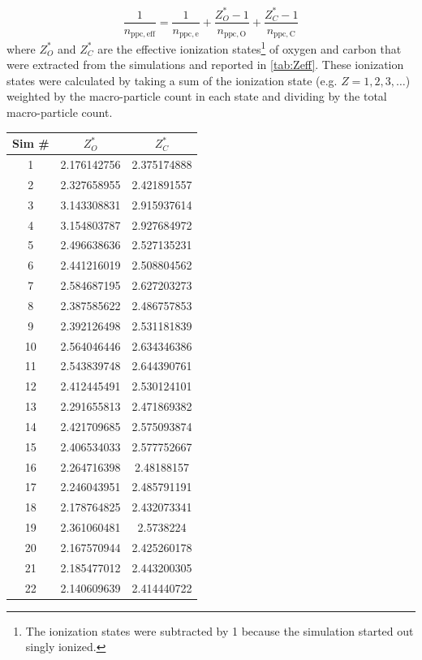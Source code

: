 \begin{equation}
	\frac{1}{n_\mathrm{ppc,eff}} = \frac{1}{n_\mathrm{ppc,e}} + \frac{Z^*_O-1}{n_\mathrm{ ppc,O}} +\frac{Z^*_C-1}{n_\mathrm{ppc,C}}
	\label{eq:neff}
\end{equation}
where $Z_O^*$ and $Z_C^*$ are the effective ionization states\footnote{The ionization states were subtracted by 1 because the simulation started out singly ionized.} of oxygen and carbon that were extracted from the simulations and reported in \autoref{tab:Zeff}. These ionization states were calculated by taking a sum of the ionization state (e.g. $Z = {1, 2, 3, \ldots}$) weighted by the macro-particle count in each state and dividing by the total macro-particle count.

\begin{table}
	\centering
	\begin{tabular}{c|c|c}
		\hline
		Sim \# & $Z_O^*$ & $Z_C^*$ \\ \hline
		1 & 2.176142756 & 2.375174888 \\ 
		2 & 2.327658955 & 2.421891557 \\ 
		3 & 3.143308831 & 2.915937614 \\ 
		4 & 3.154803787 & 2.927684972 \\ 
		5 & 2.496638636 & 2.527135231 \\ 
		6 & 2.441216019 & 2.508804562 \\ 
		7 & 2.584687195 & 2.627203273 \\ 
		8 & 2.387585622 & 2.486757853 \\ 
		9 & 2.392126498 & 2.531181839 \\ 
		10 & 2.564046446 & 2.634346386 \\ 
		11 & 2.543839748 & 2.644390761 \\ 
		12 & 2.412445491 & 2.530124101 \\ 
		13 & 2.291655813 & 2.471869382 \\ 
		14 & 2.421709685 & 2.575093874 \\ 
		15 & 2.406534033 & 2.577752667 \\ 
		16 & 2.264716398 & 2.48188157 \\ 
		17 & 2.246043951 & 2.485791191 \\ 
		18 & 2.178764825 & 2.432073341 \\ 
		19 & 2.361060481 & 2.5738224 \\ 
		20 & 2.167570944 & 2.425260178 \\ 
		21 & 2.185477012 & 2.443200305 \\ 
		22 & 2.140609639 & 2.414440722 \\ 

\end{tabular}
\end{table}
